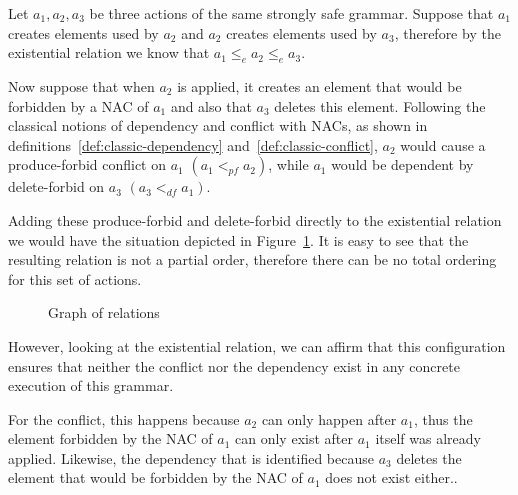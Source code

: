 \begin{example}
Let $a_1, a_2, a_3$ be three actions of the same strongly safe grammar. Suppose that $a_1$ creates elements used by $a_2$ and $a_2$ creates elements used by $a_3$, therefore by the existential relation we know that $a_1 \leq_e a_2 \leq_e a_3$.

  Now suppose that when $a_2$ is applied, it creates an element that would be forbidden by a NAC of $a_1$ and also that $a_3$ deletes this element. Following the classical notions of dependency and conflict with NACs, as shown in definitions~\ref{def:classic-dependency} and~\ref{def:classic-conflict}, $a_2$ would cause a produce-forbid conflict on $a_1$ $(a_1 <_{pf} a_2)$, while $a_1$ would be dependent by delete-forbid on $a_3$ $(a_3 <_{df} a_1)$.
  
  Adding these produce-forbid and delete-forbid directly to the existential relation we would have the situation depicted in Figure~\ref{fig:process:order:occurrence-relation-fail}. It is easy to see that the resulting relation is not a partial order, therefore there can be no total ordering for this set of actions.
\begin{figure}[!ht]
  \centering
  \caption{Graph of relations}\label{fig:process:order:occurrence-relation-fail}
\end{figure}

However, looking at the existential relation, we can affirm that this configuration ensures that neither the conflict nor the dependency exist in any concrete execution of this grammar. 

  For the conflict, this happens because $a_2$ can only happen after $a_1$, thus the element forbidden by the NAC of $a_1$ can only exist after $a_1$ itself was already applied. Likewise, the dependency that is identified because $a_3$ deletes the element that would be forbidden by the NAC of $a_1$ does not exist either.. 
\end{example}

